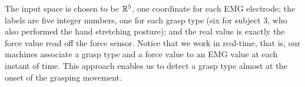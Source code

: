 The input space is chosen to be $\mathbb{R}^5$, one coordinate for each EMG
electrode; the labels are five integer numbers, one for each grasp
type (six for subject $3$, who also performed the hand stretching
posture); and the real value is exactly the force value read off the
force sensor. Notice that we work in real-time, that is, our machines
associate a grasp type and a force value to an EMG value at each
instant of time. This approach enables us to detect a grasp type
almost at the onset of the grasping movement.
